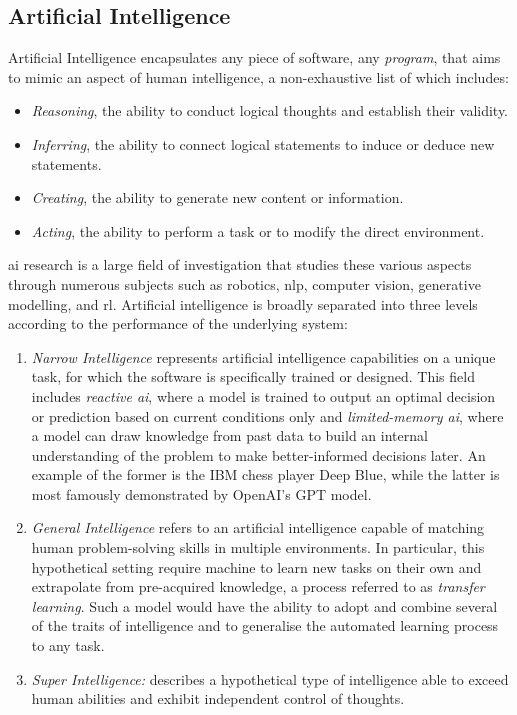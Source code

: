 \subsection{Artificial Intelligence}
Artificial Intelligence encapsulates any piece of software, any \textit{program}, that aims to mimic an aspect of human intelligence, a non-exhaustive list of which includes: 
\begin{itemize}
    \item \textit{Reasoning}, the ability to conduct logical thoughts and establish their validity.
    \item \textit{Inferring}, the ability to connect logical statements to induce or deduce new statements.
    \item \textit{Creating}, the ability to generate new content or information. 
    \item \textit{Acting}, the ability to perform a task or to modify the direct environment.
\end{itemize}
\gls{ai} research is a large field of investigation that studies these various aspects through numerous subjects such as robotics, \gls{nlp}, computer vision, generative modelling, and \gls{rl}. Artificial intelligence is broadly separated into three levels according to the performance of the underlying system: 
\begin{enumerate}
    \item \textit{Narrow Intelligence} represents artificial intelligence capabilities on a unique task, for which the software is specifically trained or designed. This field includes \textit{reactive \gls{ai}}, where a model is trained to output an optimal decision or prediction based on current conditions only and \textit{limited-memory \gls{ai}}, where a model can draw knowledge from past data to build an internal understanding of the problem to make better-informed decisions later. An example of the former is the IBM chess player Deep Blue, while the latter is most famously demonstrated by OpenAI's GPT model. 
    \item \textit{General Intelligence} refers to an artificial intelligence capable of matching human problem-solving skills in multiple environments. In particular, this hypothetical setting require machine to learn new tasks on their own and extrapolate from pre-acquired knowledge, a process referred to as \textit{transfer learning}. Such a model would have the ability to adopt and combine several of the traits of intelligence and to generalise the automated learning process to any task.
    \item \textit{Super Intelligence:} describes a hypothetical type of intelligence able to exceed human abilities and exhibit independent control of thoughts. 
\end{enumerate}

